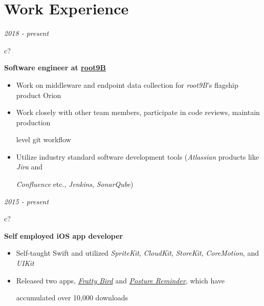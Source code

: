 \documentclass[12pt,a4paper,sans]{moderncv} %
\begin{document}
\vspace{-4 mm}
\section{Work Experience}

\textit{2018 - present}
\hspace{-1.7 mm}
\begin{tabular}{c?}
 \\
\end{tabular}
 \hspace{2 mm}
 \textbf{Software engineer at \href{https://www.root9b.com/}{root9B}}

 \vspace{-1 mm}
 \begin{itemize}
 \addtolength{\itemindent}{31.7 mm}
 \vspace{2 pt}
 \item Work on middleware and endpoint data collection for \textit{root9B}'s flagship product Orion
 
 \item{Work closely with other team members, participate in code reviews, maintain production 
 
 \hspace{30.5 mm} level git workflow } 
 
 \item Utilize industry standard software development tools (\textit{Atlassian} products like \textit{Jira} and
 
 \hspace{30.5 mm} \textit{Confluence} etc.,  \textit{Jenkins}, \textit{SonarQube})
 
 \end{itemize}
 
 
 \textit{2015 - present}
\hspace{-1.7 mm}
\begin{tabular}{c?}
 \\
\end{tabular}
 \hspace{2 mm}
 \textbf{Self employed iOS app developer} 
 
 \begin{itemize}
 \addtolength{\itemindent}{31.7 mm}
    \item Self-taught Swift and utilized \textit{SpriteKit}, \textit{CloudKit}, \textit{StoreKit}, \textit{CoreMotion}, and \textit{UIKit}
 \item Released two apps, \href{https://itunes.apple.com/us/app/fratty-bird-the-game/id1143642394?mt=8}{\textit{Fratty Bird}} and \href{https://itunes.apple.com/us/app/posture-reminder/id1280214465?mt=8}{\textit{Posture Reminder}}, which have 
 
   \hspace{30.5 mm}  accumulated over 10,000 downloads
   
 \end{itemize}
 
\end{document}

